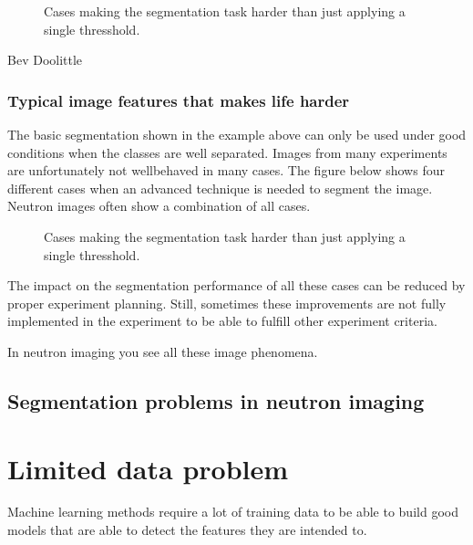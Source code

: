 \documentclass[letterpaper,10pt,english]{sphinxmanual}
\begin{document}
\begin{figure}[htbp]
\centering
\capstart

\noindent{}
\caption{Cases making the segmentation task harder than just applying a single thresshold.}\label{\detokenize{ML4NeutronImageSegmentation:id10}}\end{figure}



 Bev Doolittle


\subsection{Typical image features that makes life harder}
\label{\detokenize{ML4NeutronImageSegmentation:typical-image-features-that-makes-life-harder}}
The basic segmentation shown in the example above can only be used under good conditions when the classes are well separated. Images from many experiments are unfortunately not well\sphinxhyphen{}behaved in many cases. The figure below shows four different cases when an advanced technique is needed to segment the image. Neutron images often show a combination of all cases.

\begin{figure}[htbp]
\centering
\capstart

\noindent{}
\caption{Cases making the segmentation task harder than just applying a single thresshold.}\label{\detokenize{ML4NeutronImageSegmentation:id11}}\end{figure}

The impact on the segmentation performance of all these cases can be reduced by proper experiment planning. Still, sometimes these improvements are not fully implemented in the experiment to be able to fulfill other experiment criteria.



In neutron imaging you see all these image phenomena.


\section{Segmentation problems in neutron imaging}
\label{\detokenize{ML4NeutronImageSegmentation:segmentation-problems-in-neutron-imaging}}

\chapter{Limited data problem}
\label{\detokenize{ML4NeutronImageSegmentation:limited-data-problem}}
Machine learning methods require a lot of training data to be able to build good models that are able to detect the features they are intended to.
\end{document}
